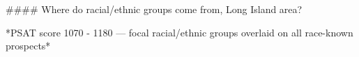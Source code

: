 #### Where do racial/ethnic groups come from, Long Island area?

*PSAT score 1070 - 1180 — focal racial/ethnic groups overlaid on all race-known prospects*
